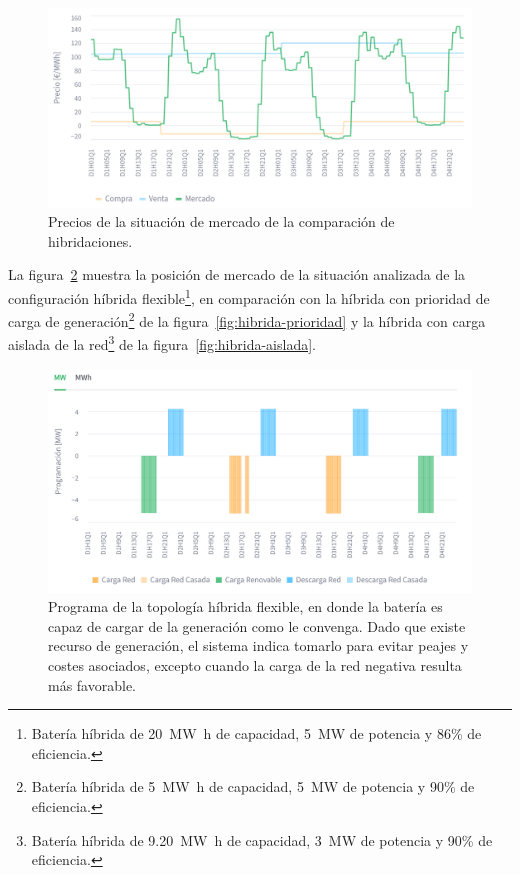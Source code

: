 \begin{figure}
  \centering
  \includegraphics[width=0.75\linewidth]{figures/precios-hibridaciones.png}
  \caption[Precios de la situación de mercado de la comparación de hibridaciones.]{Precios de la situación de mercado de la comparación de hibridaciones.}
  \label{fig:precios-hibridaciones}
\end{figure}

La figura~\ref{fig:hibrida-flexible} muestra la posición de mercado de la situación analizada de la configuración híbrida flexible\footnote{Batería híbrida de \SI{20}{{\mega\watt\hour}} de capacidad, \SI{5}{{\mega\watt}} de potencia y 86\% de eficiencia.}, en comparación con la híbrida con prioridad de carga de generación\footnote{Batería híbrida de \SI{5}{{\mega\watt\hour}} de capacidad, \SI{5}{{\mega\watt}} de potencia y 90\% de eficiencia.} de la figura~\ref{fig:hibrida-prioridad} y la híbrida con carga aislada de la red\footnote{Batería híbrida de \SI{9.20}{{\mega\watt\hour}} de capacidad, \SI{3}{{\mega\watt}} de potencia y 90\% de eficiencia.} de la figura~\ref{fig:hibrida-aislada}.

\begin{figure}
  \centering
  \includegraphics[width=0.75\linewidth]{figures/hibrida-flexible.png}
  \caption[Programa de la topología híbrida flexible.]{Programa de la topología híbrida flexible, en donde la batería es capaz de cargar de la generación como le convenga. Dado que existe recurso de generación, el sistema indica tomarlo para evitar peajes y costes asociados, excepto cuando la carga de la red negativa resulta más favorable.}
  \label{fig:hibrida-flexible}
\end{figure}

